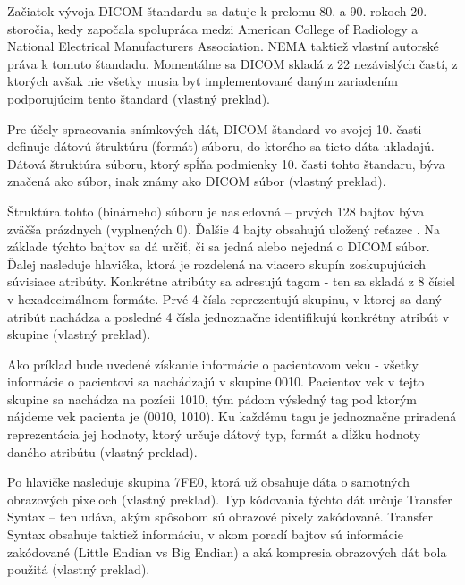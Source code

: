 Začiatok vývoja DICOM štandardu sa datuje k prelomu 80. a 90. rokoch 20. storočia, kedy započala spolupráca medzi American College of Radiology a National Electrical Manufacturers Association. NEMA taktiež vlastní autorské práva k tomuto štandadu. Momentálne sa DICOM skladá z 22 nezávislých častí, z ktorých avšak nie všetky musia byť implementované daným zariadením podporujúcim tento štandard \cite{dicom_history} (vlastný preklad).

Pre účely spracovania snímkových dát, DICOM štandard vo svojej 10. časti definuje dátovú štruktúru (formát) súboru, do ktorého sa tieto dáta ukladajú. Dátová štruktúra súboru, ktorý spĺňa podmienky 10. časti tohto štandaru, býva značená ako  súbor, inak známy ako DICOM súbor \cite{Varma_2012} (vlastný preklad).

Štruktúra tohto (binárneho) súboru je nasledovná -- prvých 128 bajtov býva zväčša prázdnych (vyplnených 0). Ďalšie 4 bajty obsahujú uložený reťazec .  Na základe týchto bajtov sa dá určiť, či sa jedná alebo nejedná o DICOM súbor.
Ďalej nasleduje hlavička, ktorá je rozdelená na viacero skupín zoskupujúcich súvisiace atribúty. Konkrétne atribúty sa adresujú tagom - ten sa skladá z 8 čísiel v hexadecimálnom formáte. Prvé 4 čísla reprezentujú skupinu, v ktorej sa daný atribút nachádza a posledné 4 čísla jednoznačne identifikujú konkrétny atribút v skupine \cite{Varma_2012} (vlastný preklad).

Ako príklad bude uvedené získanie informácie o pacientovom veku - všetky informácie o pacientovi sa nachádzajú v skupine 0010. Pacientov vek v tejto skupine sa nachádza na pozícii 1010, tým pádom výsledný tag pod ktorým nájdeme vek pacienta je (0010, 1010). Ku každému tagu je jednoznačne priradená reprezentácia jej hodnoty, ktorý určuje dátový typ, formát a dĺžku hodnoty daného atribútu  \cite{Varma_2012} (vlastný preklad).

Po hlavičke nasleduje skupina 7FE0, ktorá už obsahuje dáta o samotných obrazových pixeloch \cite{Varma_2012} (vlastný preklad). Typ kódovania týchto dát určuje Transfer Syntax -- ten udáva, akým spôsobom sú obrazové pixely zakódované. Transfer Syntax obsahuje taktiež informáciu, v akom poradí bajtov sú informácie zakódované (Little Endian vs Big Endian) a aká kompresia obrazových dát bola použitá \cite{dicom_transfer_syntax} (vlastný preklad).

